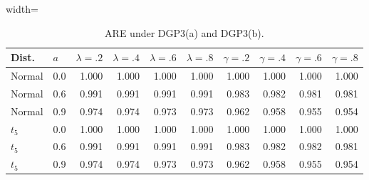 \begin{table}[htbp]
\centering
\caption{\label{tab_ARE} ARE under DGP3(a) and DGP3(b).}
\begin{adjustbox}{width=\textwidth}
\begin{tabular}{llrrrrrrrr}
\toprule
Dist. & $a$ & $\lambda=.2$ & $\lambda=.4$ & $\lambda=.6$ & $\lambda=.8$ & $\gamma=.2$ & $\gamma=.4$ & $\gamma=.6$ & $\gamma=.8$ \\
\midrule
        Normal & 0.0 & 1.000 & 1.000 & 1.000 & 1.000 & 1.000 & 1.000 & 1.000 & 1.000 \\
        Normal & 0.6 & 0.991 & 0.991 & 0.991 & 0.991 & 0.983 & 0.982 & 0.981 & 0.981 \\
        Normal & 0.9 & 0.974 & 0.974 & 0.973 & 0.973 & 0.962 & 0.958 & 0.955 & 0.954 \\
        $t_5$ & 0.0 & 1.000 & 1.000 & 1.000 & 1.000 & 1.000 & 1.000 & 1.000 & 1.000 \\
        $t_5$ & 0.6 & 0.991 & 0.991 & 0.991 & 0.991 & 0.983 & 0.982 & 0.982 & 0.981 \\
        $t_5$ & 0.9 & 0.974 & 0.974 & 0.973 & 0.973 & 0.962 & 0.958 & 0.955 & 0.954 \\
\bottomrule
\end{tabular}
\end{adjustbox}
\end{table}
